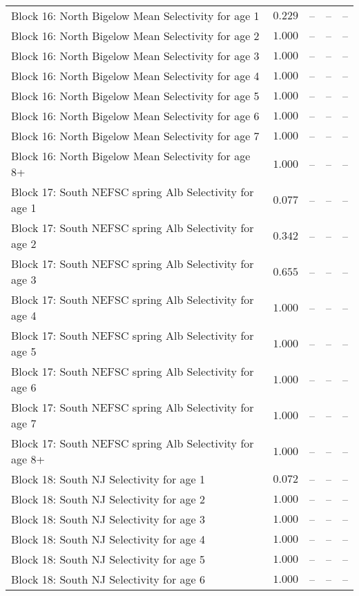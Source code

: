 \documentclass[
]{article}
\begin{document}
\begin{landscape}
\begin{longtable}[t]{lrrrr}
Block 16: North Bigelow Mean Selectivity for age 1 & $0.229$ & -- & -- & --\\
Block 16: North Bigelow Mean Selectivity for age 2 & $1.000$ & -- & -- & --\\
Block 16: North Bigelow Mean Selectivity for age 3 & $1.000$ & -- & -- & --\\
\addlinespace
Block 16: North Bigelow Mean Selectivity for age 4 & $1.000$ & -- & -- & --\\
Block 16: North Bigelow Mean Selectivity for age 5 & $1.000$ & -- & -- & --\\
Block 16: North Bigelow Mean Selectivity for age 6 & $1.000$ & -- & -- & --\\
Block 16: North Bigelow Mean Selectivity for age 7 & $1.000$ & -- & -- & --\\
Block 16: North Bigelow Mean Selectivity for age 8+ & $1.000$ & -- & -- & --\\
\addlinespace
Block 17: South NEFSC spring Alb Selectivity for age 1 & $0.077$ & -- & -- & --\\
Block 17: South NEFSC spring Alb Selectivity for age 2 & $0.342$ & -- & -- & --\\
Block 17: South NEFSC spring Alb Selectivity for age 3 & $0.655$ & -- & -- & --\\
Block 17: South NEFSC spring Alb Selectivity for age 4 & $1.000$ & -- & -- & --\\
Block 17: South NEFSC spring Alb Selectivity for age 5 & $1.000$ & -- & -- & --\\
\addlinespace
Block 17: South NEFSC spring Alb Selectivity for age 6 & $1.000$ & -- & -- & --\\
Block 17: South NEFSC spring Alb Selectivity for age 7 & $1.000$ & -- & -- & --\\
Block 17: South NEFSC spring Alb Selectivity for age 8+ & $1.000$ & -- & -- & --\\
Block 18: South NJ Selectivity for age 1 & $0.072$ & -- & -- & --\\
Block 18: South NJ Selectivity for age 2 & $1.000$ & -- & -- & --\\
\addlinespace
Block 18: South NJ Selectivity for age 3 & $1.000$ & -- & -- & --\\
Block 18: South NJ Selectivity for age 4 & $1.000$ & -- & -- & --\\
Block 18: South NJ Selectivity for age 5 & $1.000$ & -- & -- & --\\
Block 18: South NJ Selectivity for age 6 & $1.000$ & -- & -- & --\\

\end{longtable}
\end{landscape}
\end{document}
